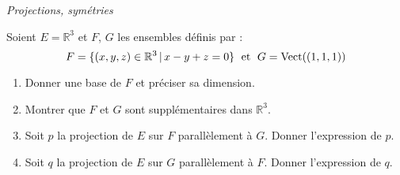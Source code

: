 \documentclass[a4paper,10pt]{report}
\begin{document}
\medskip

\begin{center}
\textit{{ {\large Projections, symétries}}}
\end{center}

\medskip


\begin{Exercice}{} Soient $E= \mathbb{R}^3$ et $F$, $G$ les ensembles définis par :
$$ F = \lbrace (x,y,z) \in \mathbb{R}^3 \, \vert \, x-y+z=0 \rbrace \; \hbox{ et }  \; G = \textrm{Vect}((1,1,1)) $$

\begin{enumerate}
\item Donner une base de $F$ et préciser sa dimension.
\item Montrer que $F$ et $G$ sont supplémentaires dans $\mathbb{R}^3$.
\item Soit $p$ la projection de $E$ sur $F$ parallèlement à $G$. Donner l'expression de $p$.
\item Soit $q$ la projection de $E$ sur $G$ parallèlement à $F$. Donner l'expression de $q$.
\end{enumerate}
\end{Exercice}

\corr  
\end{document}
